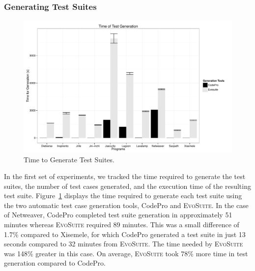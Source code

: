 \subsubsection{Generating Test Suites }
\begin{figure}[!t]
\centering
  \includegraphics[width=\linewidth]{RGraphs/TimeOfGeneration.pdf}
    \caption{Time to Generate Test Suites.}
  \label{fig:TimeGen}
\end{figure}
In the first set of experiments, we tracked the time required to generate the test suites, the number of test cases generated, and the execution time of the resulting test suite.  Figure~\ref{fig:TimeGen} displays the time required to generate each test suite using the two automatic test case generation tools, CodePro and \textsc{EvoSuite}.  In the case of Netweaver, CodePro completed test suite generation in approximately 51 minutes whereas \textsc{EvoSuite} required 89 minutes.  This was a small difference of 1.7\% compared to Xisemele, for which CodePro generated a test suite in just 13 seconds compared to 32 minutes from \textsc{EvoSuite}.  The time needed by \textsc{EvoSuite} was 148\% greater in this case.  On average, \textsc{EvoSuite} took 78\% more time in test generation compared to CodePro.

